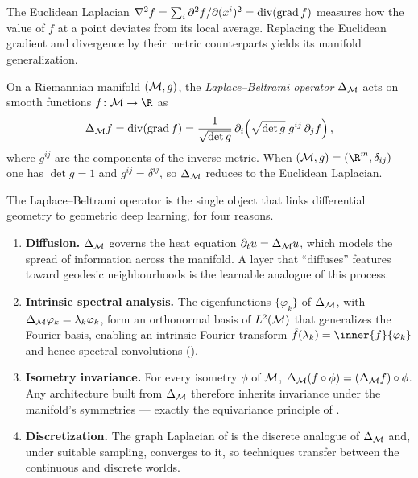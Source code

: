 The Euclidean Laplacian $\nabla^2 f = \sum_i \partial^2 f / \partial(x^i)^2 =
\operatorname{div}(\operatorname{grad} f)$ measures how the value of $f$ at a point deviates from its
local average. Replacing the Euclidean gradient and divergence by their
metric counterparts yields its manifold generalization.

\begin{definition}
\label{def:geo:laplace-beltrami}
On a Riemannian manifold $(\mathcal{M}, g)$, the \emph{Laplace--Beltrami operator}
$\Delta_{\mathcal{M}}$ acts on smooth functions $f \colon \M \to \R$ as
\[
  \Delta_{\mathcal{M}} f = \operatorname{div}(\operatorname{grad} f)
    = \frac{1}{\sqrt{\det g}}\, \partial_i\!\left(\sqrt{\det g}\; g^{ij}\, \partial_j f\right),
\]
where $g^{ij}$ are the components of the inverse metric. When
$(\M, g) = (\R^m, \delta_{ij})$ one has $\det g = 1$ and $g^{ij} = \delta^{ij}$,
so $\Delta_{\mathcal{M}}$ reduces to the Euclidean Laplacian.
\end{definition}

The Laplace--Beltrami operator is the single object that links differential
geometry to geometric deep learning, for four reasons.

\begin{remark}
\label{rem:geo:lb-role}
\leavevmode
\begin{enumerate}
  \item \textbf{Diffusion.} $\Delta_{\mathcal{M}}$ governs the heat equation
    $\partial_t u = \Delta_{\mathcal{M}} u$, which models the spread of information across
    the manifold. A layer that ``diffuses'' features toward geodesic
    neighbourhoods is the learnable analogue of this process.
  \item \textbf{Intrinsic spectral analysis.} The eigenfunctions
    $\{\varphi_k\}$ of $\Delta_{\mathcal{M}}$, with $\Delta_{\mathcal{M}} \varphi_k = \lambda_k
    \varphi_k$, form an orthonormal basis of $L^2(\mathcal{M})$ that generalizes the
    Fourier basis, enabling an intrinsic Fourier transform
    $\hat f(\lambda_k) = \inner{f}{\varphi_k}$ and hence spectral convolutions
    ().
  \item \textbf{Isometry invariance.} For every isometry $\phi$ of $\mathcal{M}$,
    $\Delta_{\mathcal{M}}(f \circ \phi) = (\Delta_{\mathcal{M}} f) \circ \phi$. Any architecture built
    from $\Delta_{\mathcal{M}}$ therefore inherits invariance under the manifold's
    symmetries --- exactly the equivariance principle of .
  \item \textbf{Discretization.} The graph Laplacian of  is the
    discrete analogue of $\Delta_{\mathcal{M}}$ and, under suitable sampling, converges to
    it, so techniques transfer between the continuous and discrete worlds.
\end{enumerate}
\end{remark}

